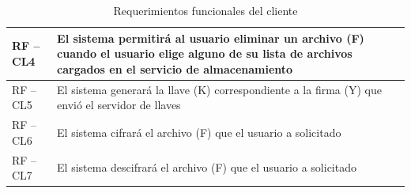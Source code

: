 \begin{table}[htb]
\begin{tabular}{| p{2cm} |  p{13.5cm} |}
RF – CL4 &El sistema permitirá al usuario eliminar un archivo (F) cuando el usuario elige alguno de su lista de archivos cargados en el servicio de almacenamiento  \\ \hline
RF – CL5 & El sistema generará la llave (K) correspondiente a la firma (Y) que envió el servidor de llaves  \\ \hline
RF – CL6 & El sistema cifrará el archivo (F) que el usuario a solicitado \\ \hline
RF – CL7 & El sistema descifrará el archivo (F) que el usuario a solicitado  \\ \hline
\end{tabular}
\caption{Requerimientos funcionales del cliente}
\label{Cliente }
\end{table}


